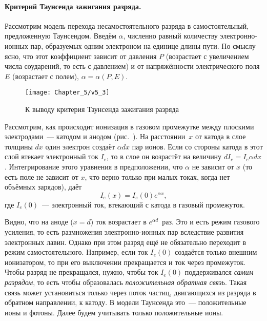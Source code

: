 \paragraph{Критерий Таунсенда зажигания разряда.}
Рассмотрим модель перехода несамостоятельного разряда в
самостоятельный, предложенную Таунсендом.
Введём  $\alpha$,
численно равный количеству электронно-ионных
пар, образуемых одним электроном на единице длины пути. По смыслу ясно, что этот
коэффициент зависит от давления $P$
(возрастает с увеличением числа соударений, то есть с давлением) и от
напряжённости электрического поля $E$ (возрастает
с полем), $\alpha=\alpha(P,E)$.

\begin{figure}[h!]
    \centering
    \texttt{[image: Chapter\_5/v5\_3]}
    \caption{К выводу критерия Таунсенда зажигания разряда}
\end{figure}

Рассмотрим, как происходит ионизация в газовом промежутке между плоскими
электродами~--- катодом и анодом (рис.~). На
расстоянии~$x$ от катода в слое толщины $dx$ один электрон создаёт $\alpha dx$
пар ионов. Если со стороны катода в этот
слой втекает электронный ток $I_e$, то в слое он возрастёт на величину
$dI_e=I_e\alpha dx$. Интегрирование этого
уравнения в предположении, что $\alpha$ не зависит от $x$ (то есть поле не
зависит от $x$, что верно только при малых
токах, когда нет объёмных зарядов), даёт
\begin{equation*}
	I_e(x)=I_e(0)e^{\alpha x},
\end{equation*}
где $I_e(0)$~--- электронный ток, втекающий с катода в газовый промежуток.

Видно, что на аноде ($x=d$) ток возрастает в $e^{\alpha d}$~раз.
Это и есть режим газового усиления, то есть размножения
электронно-ионных пар вследствие развития
электронных лавин. Однако при этом разряд ещё не обязательно переходит в режим
самостоятельного. Например, если ток
$I_e(0)$ создаётся только внешним ионизатором, то при его выключении
прекращается и ток через промежуток. Чтобы разряд
не прекращался, нужно, чтобы ток $I_e(0)$ поддерживался \emph{самим разрядом},
то есть чтобы образовалась \emph{положительная
    обратная связь}. Такая связь может установиться только через поток частиц,
двигающихся из разряда в обратном направлении,
к катоду. В модели Таунсенда это~--- положительные ионы и фотоны. Далее будем
учитывать только положительные ионы.

